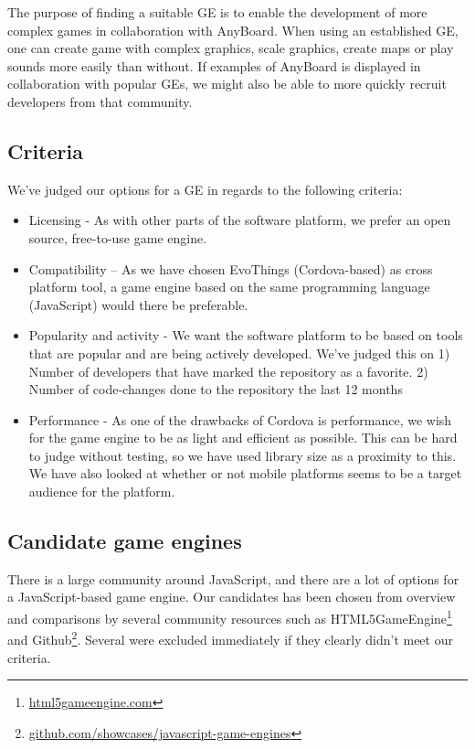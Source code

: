 The purpose of finding a suitable GE is to enable the development of more complex games in collaboration with AnyBoard. When using an established GE, one can create game with complex graphics, scale graphics, create maps or play sounds more easily than without. If examples of AnyBoard is displayed in collaboration with popular GEs, we might also be able to more quickly recruit developers from that community. 
\subsection{Criteria}

We've judged our options for a GE in regards to the following criteria:
\begin{itemize}
\item Licensing - As with other parts of the software platform, we prefer an open source, free-to-use game engine.
\item Compatibility – As we have chosen EvoThings (Cordova-based) as cross platform tool, a game engine based on the same programming language (JavaScript) would there be preferable. 
\item Popularity and activity - We want the software platform to be based on tools that are popular and are being actively developed. We've judged this on 1) Number of developers that have marked the repository as a favorite. 2) Number of code-changes done to the repository the last 12 months
\item Performance - As one of the drawbacks of Cordova is performance, we wish for the game engine to be as light and efficient as possible. This can be hard to judge without testing, so we have used library size as a proximity to this. We have also looked at whether or not mobile platforms seems to be a target audience for the platform.
\end{itemize}

\subsection{Candidate game engines}
There is a large community around JavaScript, and there are a lot of options for a JavaScript-based game engine. Our candidates has been chosen from overview and comparisons by several community resources such as HTML5GameEngine\footnote{\href{https://html5gameengine.com/}{html5gameengine.com}} and Github\footnote{\href{https://github.com/showcases/javascript-game-engines}{github.com/showcases/javascript-game-engines}}. Several were excluded immediately if they clearly didn't meet our criteria.

